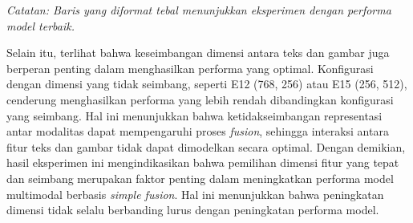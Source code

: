 \begin{table}[H]
    \centering
    \caption{Hasil Eksperimen Model multimodal Variasi Dimensi}
    \label{table:4.multimodal_dimensi}
    \scriptsize
    \setlength{\tabcolsep}{2pt}
    \renewcommand{\arraystretch}{1.1}
    \smallskip
    \begin{flushleft}
    \footnotesize \textit{Catatan: Baris yang diformat tebal menunjukkan eksperimen dengan performa model terbaik.}
    \end{flushleft}
\end{table}

Selain itu, terlihat bahwa keseimbangan dimensi antara teks dan gambar juga berperan penting dalam menghasilkan performa yang optimal. Konfigurasi dengan dimensi yang tidak seimbang, seperti E12 (768, 256) atau E15 (256, 512), cenderung menghasilkan performa yang lebih rendah dibandingkan konfigurasi yang seimbang. Hal ini menunjukkan bahwa ketidakseimbangan representasi antar modalitas dapat mempengaruhi proses \textit{fusion}, sehingga interaksi antara fitur teks dan gambar tidak dapat dimodelkan secara optimal. Dengan demikian, hasil eksperimen ini mengindikasikan bahwa pemilihan dimensi fitur yang tepat dan seimbang merupakan faktor penting dalam meningkatkan performa model multimodal berbasis \textit{simple fusion}. Hal ini menunjukkan bahwa peningkatan dimensi tidak selalu berbanding lurus dengan peningkatan performa model.


